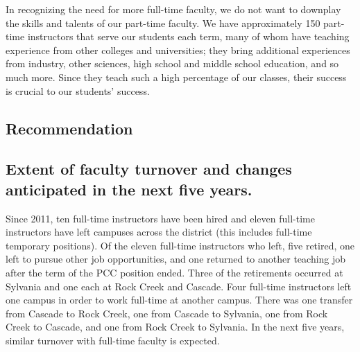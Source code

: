 In recognizing the need for more full-time faculty, we do not want to downplay
the skills and talents of our part-time faculty.  We have approximately 150
part-time instructors that serve our students each term, many of whom have
teaching experience from other colleges and universities; they bring additional
experiences from industry, other sciences, high school and middle school
education, and so much more.  Since they teach such a high percentage of our
classes, their success is crucial to our students' success.

\subsection{Recommendation}

\subsection{Extent of faculty turnover and changes anticipated in the next five
years.} 
Since 2011, ten full-time instructors have been hired and eleven full-time
instructors have left campuses across the district (this includes full-time 
temporary positions).  Of the eleven full-time
instructors who left, five retired, one left to pursue other job opportunities,
and one returned to another teaching job after the term of the PCC position
ended.  Three of the retirements occurred at Sylvania and one each at Rock
Creek and Cascade.  Four full-time instructors left one campus in order to work
full-time at another campus.   There was one transfer from Cascade to Rock
Creek, one from Cascade to Sylvania, one from Rock Creek to Cascade, and one
from Rock Creek to Sylvania.  In the next five years, similar turnover with
full-time faculty is expected.

